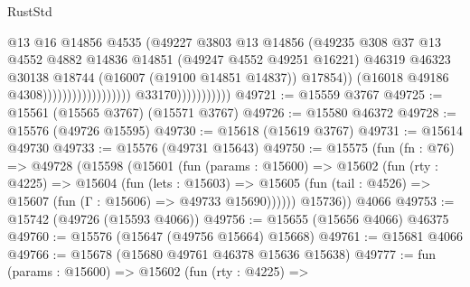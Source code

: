 \begin{lexlean}{RustStd}
\begin{coremodule}
                                                            @13
                                                            @16
                                                            @14856
                                                            @4535
                                                            (@49227
                                                              @3803
                                                              @13
                                                              @14856
                                                              (@49235
                                                                @308
                                                                @37
                                                                @13
                                                                @4552
                                                                @4882
                                                                @14836
                                                                @14851
                                                                (@49247 @4552 @49251 @16221)
                                                                @46319
                                                                @46323
                                                                @30138
                                                                @18744
                                                                (@16007 (@19100 @14851 @14837))
                                                                @17854))
                                                            (@16018 @49186 @4308))))))))))))))))))
                          @33170)))))))))))
@49721 := @15559 @3767
@49725 := @15561 (@15565 @3767) (@15571 @3767)
@49726 := @15580 @46372
@49728 := @15576 (@49726 @15595)
@49730 := @15618 (@15619 @3767)
@49731 := @15614 @49730
@49733 := @15576 (@49731 @15643)
@49750 := @15575
    (fun (fn : @76) =>
    @49728
      (@15598
        (@15601
          (fun (params : @15600) =>
          @15602
            (fun (rty : @4225) =>
            @15604
              (fun (lets : @15603) =>
              @15605 (fun (tail : @4526) => @15607 (fun (Γ : @15606) => @49733 @15690))))))
        @15736))
    @4066
@49753 := @15742 (@49726 (@15593 @4066))
@49756 := @15655 (@15656 @4066) @46375
@49760 := @15576 (@15647 (@49756 @15664) @15668)
@49761 := @15681 @4066
@49766 := @15678 (@15680 @49761 @46378 @15636 @15638)
@49777 := fun (params : @15600) =>
  @15602
    (fun (rty : @4225) =>

\end{coremodule}
\end{lexlean}
